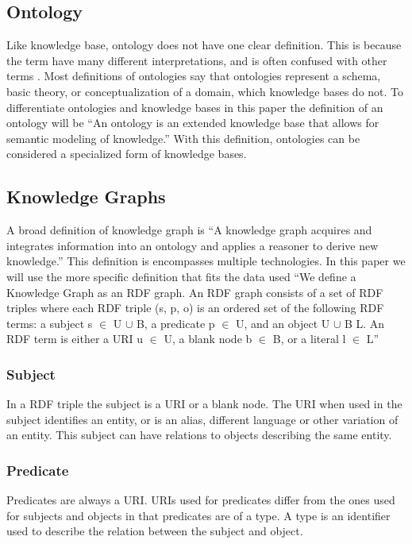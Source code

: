 \subsection{Ontology}
Like knowledge base, ontology does not have one clear definition. This is because the term have many different interpretations, and is often confused with other terms \citep{FEILMAYR20161}. Most definitions of ontologies say that ontologies represent a schema, basic theory, or conceptualization of a domain, which knowledge bases do not. \citep{davies2006semantic} To differentiate ontologies and knowledge bases in this paper the definition of an ontology will be ``An ontology is an extended knowledge base that allows for semantic modeling of knowledge.'' With this definition, ontologies can be considered a specialized form of knowledge bases.

\subsection{Knowledge Graphs}
A broad definition of knowledge graph is ``A knowledge graph acquires and integrates information into an ontology and applies a reasoner to derive new knowledge.'' \citep{KGDef} This definition is encompasses multiple technologies. In this paper we will use the more specific definition that fits the data used ``We define a Knowledge Graph as an RDF graph. An RDF graph consists of a set of RDF triples where each RDF triple (s, p, o) is an ordered set of the following RDF terms: a subject s $\in$ U $\cup$ B, a predicate p $\in$ U, and an object U $\cup$ B  L. An RDF term is either a URI u $\in$ U, a blank node b $\in$ B, or a literal l $\in$ L'' \citep{KGDefYago}

\subsubsection{Subject}
In a RDF triple the subject is a URI or a blank node. The URI when used in the subject identifies an entity, or is an alias, different language or other variation of an entity. This subject can have relations to objects describing the same entity.

\subsubsection{Predicate}
Predicates are always a URI. URIs used for predicates differ from the ones used for subjects and objects in that predicates are of a type. A type is an identifier used to describe the relation between the subject and object.

